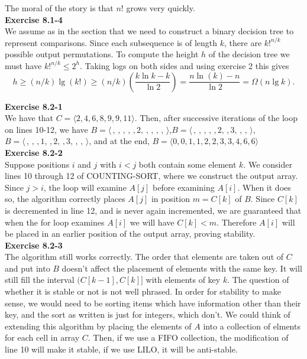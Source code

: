 \documentclass{article}
\begin{document}
The moral of the story is that $n!$ grows very quickly.\\

\noindent\textbf{Exercise 8.1-4}\\

We assume as in the section that we need to construct a binary decision tree to represent comparisons.  Since each subsequence is of length $k$, there are $k!^{n/k}$ possible output permutations. To compute the height $h$ of the decision tree we must have $k!^{n/k} \leq 2^h$.  Taking logs on both sides and using exercise 2 this gives
\[ h \geq (n/k)\lg(k!) \geq (n/k)\left(\frac{k\ln k - k}{\ln 2}\right) = \frac{n\ln(k) - n}{\ln 2} = \Omega(n \lg k).\]

\noindent\textbf{Exercise 8.2-1}\\

We have that $C = \langle 2, 4,6,8,9,9,11\rangle$. Then, after successive iterations of the loop on lines 10-12, we have $B = \langle\,,\,,\,,\,,\,,2,\,,\,,\,,\,,\,\rangle$,$B = \langle\,,\,,\,,\,,\,,2,\,,3,\,,\,,\,\rangle$,$B = \langle\,,\,,\,,1,\,,2,\,,3,\,,\,,\,\rangle$, and at the end, $B = \langle0,0,1,1,2,2,3,3,4,6,6\rangle$\\

\noindent\textbf{Exercise 8.2-2}\\

Suppose positions $i$ and $j$ with $i < j$ both contain some element $k$.  We consider lines 10 through 12 of COUNTING-SORT, where we construct the output array.  Since $j > i$, the loop will examine $A[j]$ before examining $A[i]$.  When it does so, the algorithm correctly places $A[j]$ in position $m = C[k]$ of $B$.  Since $C[k]$ is decremented in line 12, and is never again incremented, we are guaranteed that when the for loop examines $A[i]$ we will have $C[k]< m$.  Therefore $A[i]$ will be placed in an earlier position of the output array, proving stability. \\

\noindent\textbf{Exercise 8.2-3}\\

The algorithm still works correctly. The order that elements are taken out of $C$ and put into $B$ doesn't affect the placement of elements with the same key. It will still fill the interval $(C[k-1],C[k]]$ with elements of key $k$. The question of whether it is stable or not is not well phrased. In order for stability to make sense, we would need to be sorting items which have information other than their key, and the sort as written is just for integers, which don't. We could think of extending this algorithm by placing the elements of $A$ into a collection of elments for each cell in array $C$. Then, if we use a FIFO collection, the modification of line 10 will make it stable, if we use LILO, it will be anti-stable.\\
\end{document}
